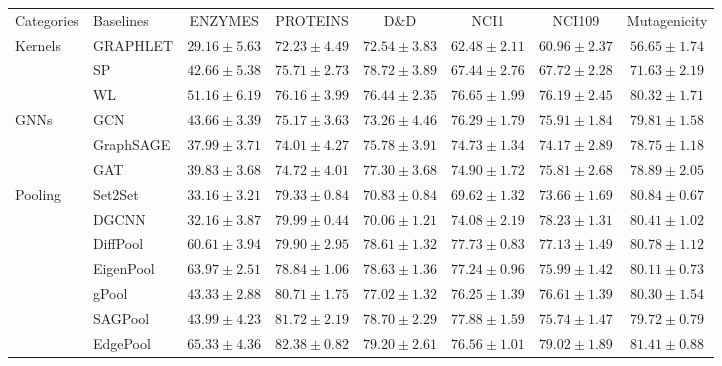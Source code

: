 \documentclass[letterpaper]{article} \usepackage{aaai20}  \usepackage{times}  \usepackage{helvet} \usepackage{courier}  \usepackage[hyphens]{url}  \usepackage{graphicx} \urlstyle{rm} \def\UrlFont{\rm}  \usepackage{graphicx}  \frenchspacing  \setlength{\pdfpagewidth}{8.5in}  \setlength{\pdfpageheight}{11in}
\begin{document}
\begin{table*}
    \centering
    \small
    \begin{tabular}{ llcccccc }
    \toprule[0.8pt]
    Categories 				& Baselines & ENZYMES 	& PROTEINS	& D\&D 		& NCI1 		& NCI109 	& Mutagenicity		\\
    \cmidrule[0.5pt]{1-8}
    \multirow{3}{*}{Kernels}& GRAPHLET  & $29.16\pm5.63$ & $72.23\pm4.49$ & $72.54\pm3.83$ & $62.48\pm2.11$ & $60.96\pm2.37$ 						& $56.65\pm1.74$\\
    						& SP		& $42.66\pm5.38$ & $75.71\pm2.73$ & $78.72\pm3.89$ & $67.44\pm2.76$ & $67.72\pm2.28$ & $71.63\pm2.19$\\
    						& WL		& $51.16\pm6.19$ & $76.16\pm3.99$ & $76.44\pm2.35$ & $76.65\pm1.99$ & $76.19\pm2.45$ & $80.32\pm1.71$\\
    \cmidrule[0.5pt]{1-8}
    \multirow{3}{*}{GNNs}	& GCN     	& $43.66\pm3.39$ & $75.17\pm3.63$ & $73.26\pm4.46$ & $76.29\pm1.79$ & $75.91\pm1.84$ 						& $79.81\pm1.58$\\
    						& GraphSAGE	& $37.99\pm3.71$ & $74.01\pm4.27$ & $75.78\pm3.91$ & $74.73\pm1.34$ & $74.17\pm2.89$ & $78.75\pm1.18$\\
   							& GAT		& $39.83\pm3.68$ & $74.72\pm4.01$ & $77.30\pm3.68$ & $74.90\pm1.72$ & $75.81\pm2.68$ & $78.89\pm2.05$\\
   	\cmidrule[0.5pt]{1-8}
   	\multirow{7}{*}{Pooling}& Set2Set	& $33.16\pm3.21$ & $79.33\pm0.84$ & $70.83\pm0.84$ & $69.62\pm1.32$ & $73.66\pm1.69$ 						& $80.84\pm0.67$\\
   							& DGCNN		& $32.16\pm3.87$ & $79.99\pm0.44$ & $70.06\pm1.21$ & $74.08\pm2.19$	& $78.23\pm1.31$ & $80.41\pm1.02$ \\
   							& DiffPool	& $60.61\pm3.94$ & $79.90\pm2.95$ & $78.61\pm1.32$ & $77.73\pm0.83$ & $77.13\pm1.49$ & $80.78\pm1.12$ \\
   							& EigenPool & $63.97\pm2.51$ & $78.84\pm1.06$ & $78.63\pm1.36$ & $77.24\pm0.96$ & $75.99\pm1.42$ & $80.11\pm0.73$ 	\\
   							& gPool		& $43.33\pm2.88$ & $80.71\pm1.75$ & $77.02\pm1.32$ & $76.25\pm1.39$ & $76.61\pm1.39$ & $80.30\pm1.54$	\\
   							& SAGPool	& $43.99\pm4.23$ & $81.72\pm2.19$ & $78.70\pm2.29$ & $77.88\pm1.59$ & $75.74\pm1.47$ & $79.72\pm0.79$	\\
    						& EdgePool	& $65.33\pm4.36$ & $82.38\pm0.82$ & $79.20\pm2.61$ & $76.56\pm1.01$ & $79.02\pm1.89$ & $81.41\pm0.88$	\\
    \cmidrule[0.5pt]{1-8}

\end{tabular}
\end{table*}
\end{document}
